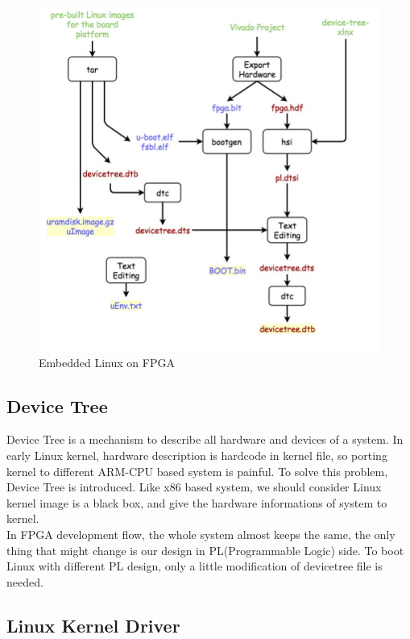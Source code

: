 \begin{figure}[!htb]
  \centering
  \includegraphics[scale=0.5]{images/embedded_linux.jpg}
  \caption[Embedded Linux on FPGA]{Embedded Linux on FPGA}
  \label{fig:Embedded Linux on FPGA}
\end{figure}



\subsection{Device Tree}
\label{subsec:Device Tree}

Device Tree is a mechanism to describe all hardware and devices of a system. In early Linux 
kernel, hardware description is hardcode in kernel file, so porting kernel to different
ARM-CPU based system is painful. To solve this problem, Device Tree is introduced. 
Like x86 based system, we should consider Linux kernel image is a black box, and give the 
hardware informations of system to kernel. \\
%
In FPGA development flow, the whole system almost keeps the same, the only thing that might change 
is our design in PL(Programmable Logic) side. To boot Linux with different PL design, only 
a little modification of devicetree file is needed.     


\subsection{Linux Kernel Driver}
\label{subsec:Linux Kernel Driver} 


